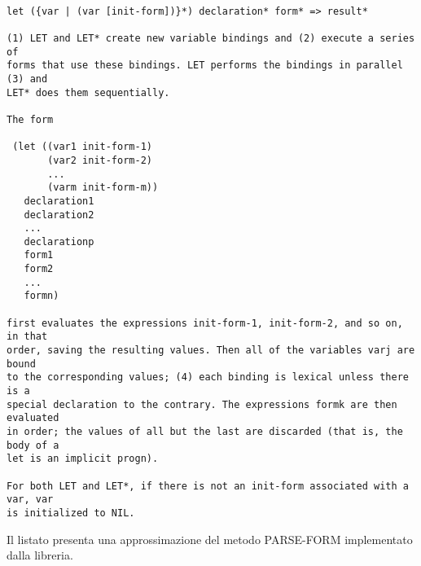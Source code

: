 \begin{lstlisting}

let ({var | (var [init-form])}*) declaration* form* => result*

(1) LET and LET* create new variable bindings and (2) execute a series of
forms that use these bindings. LET performs the bindings in parallel (3) and
LET* does them sequentially.

The form

 (let ((var1 init-form-1)
       (var2 init-form-2)
       ...
       (varm init-form-m))
   declaration1
   declaration2
   ...
   declarationp
   form1
   form2
   ...
   formn)

first evaluates the expressions init-form-1, init-form-2, and so on, in that
order, saving the resulting values. Then all of the variables varj are bound
to the corresponding values; (4) each binding is lexical unless there is a
special declaration to the contrary. The expressions formk are then evaluated
in order; the values of all but the last are discarded (that is, the body of a
let is an implicit progn).

For both LET and LET*, if there is not an init-form associated with a var, var
is initialized to NIL.

\end{lstlisting}

Il listato presenta una approssimazione del metodo PARSE-FORM implementato
dalla libreria.

